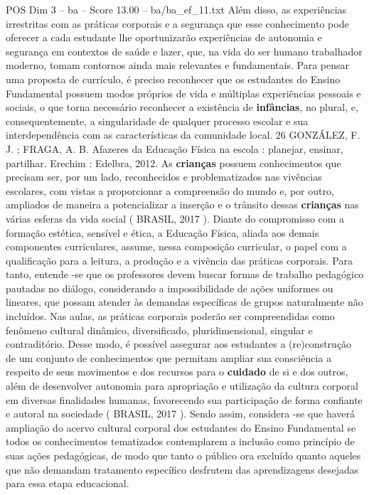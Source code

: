 \begin{textsample}{POS Dim 3 – ba – Score 13.00 – ba/ba\_ef\_11.txt}
Além disso, as experiências irrestritas com as práticas corporais e a segurança que esse conhecimento pode oferecer a cada estudante lhe oportunizarão experiências de autonomia e segurança em contextos de saúde e lazer, que, na vida do ser humano trabalhador moderno, tomam contornos ainda mais relevantes e fundamentais.
Para pensar uma proposta de currículo, é preciso reconhecer que os estudantes do Ensino Fundamental possuem modos próprios de vida e múltiplas experiências pessoais e sociais, o que torna necessário reconhecer a existência de \textbf{infâncias}, no plural, e, consequentemente, a singularidade de qualquer processo escolar e sua interdependência com as características da comunidade local. 26 GONZÁLEZ, F.
J. ; FRAGA, A.
B.
Afazeres da Educação Física na escola : planejar, ensinar, partilhar.
Erechim : Edelbra, 2012.
As \textbf{crianças} possuem conhecimentos que precisam ser, por um lado, reconhecidos e problematizados nas vivências escolares, com vistas a proporcionar a compreensão do mundo e, por outro, ampliados de maneira a potencializar a inserção e o trânsito dessas \textbf{crianças} nas várias esferas da vida social ( BRASIL, 2017 ).
Diante do compromisso com a formação estética, sensível e ética, a Educação Física, aliada aos demais componentes curriculares, assume, nessa composição curricular, o papel com a qualificação para a leitura, a produção e a vivência das práticas corporais.
Para tanto, entende -se que os professores devem buscar formas de trabalho pedagógico pautadas no diálogo, considerando a impossibilidade de ações uniformes ou lineares, que possam atender às demandas específicas de grupos naturalmente não incluídos.
Nas aulas, as práticas corporais poderão ser compreendidas como fenômeno cultural dinâmico, diversificado, pluridimensional, singular e contraditório.
Desse modo, é possível assegurar aos estudantes a (re)construção de um conjunto de conhecimentos que permitam ampliar sua consciência a respeito de seus movimentos e dos recursos para o \textbf{cuidado} de si e dos outros, além de desenvolver autonomia para apropriação e utilização da cultura corporal em diversas finalidades humanas, favorecendo sua participação de forma confiante e autoral na sociedade ( BRASIL, 2017 ).
Sendo assim, considera -se que haverá ampliação do acervo cultural corporal dos estudantes do Ensino Fundamental se todos os conhecimentos tematizados contemplarem a inclusão como princípio de suas ações pedagógicas, de modo que tanto o público ora excluído quanto aqueles que não demandam tratamento específico desfrutem das aprendizagens desejadas para essa etapa educacional.

\end{textsample}
